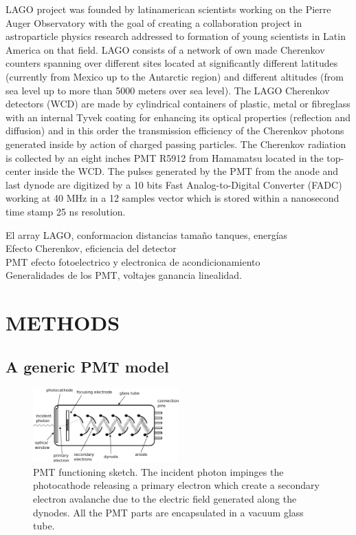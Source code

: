 \documentclass[letterpaper, 10 pt, conference]{ieeeconf}  %
\begin{document}

LAGO project was founded by latinamerican scientists working on the Pierre Auger Observatory with the goal of creating a collaboration project in astroparticle physics research addressed to formation of young scientists in Latin America on that field. LAGO consists of a network of own made Cherenkov counters spanning over different sites located at significantly different latitudes (currently from Mexico up to the Antarctic region) and different altitudes (from sea level up to more than 5000 meters over sea level). The LAGO Cherenkov detectors (WCD) are made by cylindrical containers of plastic, metal or fibreglass with an internal Tyvek coating for enhancing its optical properties (reflection and diffusion) and in this order the transmission efficiency of the Cherenkov photons generated inside by action of charged passing particles. The Cherenkov radiation is collected by an eight inches PMT R5912 from Hamamatsu located in the top-center inside the WCD. The pulses generated by the PMT from the anode and last dynode are digitized by a 10 bits Fast Analog-to-Digital Converter (FADC) working at 40 MHz in a 12 samples vector which is stored within a nanosecond time stamp 25 ns resolution.


El array LAGO, conformacion distancias tamaño tanques, energías\\

Efecto Cherenkov, eficiencia del detector\\
PMT efecto fotoelectrico y electronica de acondicionamiento\\

Generalidades de los PMT, voltajes ganancia linealidad.


\section{METHODS}

\subsection{A generic PMT model}

\begin{figure}[h!]
\begin{center}
\includegraphics[width=0.5\textwidth]{Figures/PMT.eps}
\caption{PMT functioning sketch. The incident photon impinges the photocathode releasing a primary electron which create a secondary electron avalanche due to the electric field generated along the dynodes. All the PMT parts are encapsulated in a vacuum glass tube.}
\label{Gain_curve}
\end{center}
\end{figure}
\end{document}
